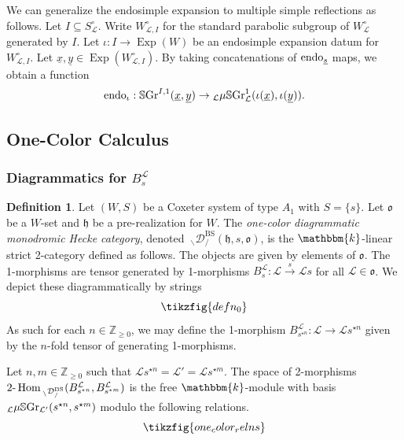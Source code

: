 \documentclass{amsart}
\newcommand{\Z}{\mathbb{Z}}
\renewcommand{\k}{\mathbbm{k}}
\newcommand{\scrL}{\mathcal{L}}
\DeclareMathOperator{\Hom}{Hom}
\newcommand{\TwoHom}{2\textnormal{-}\Hom}
\newcommand{\fr}[1]{\mathfrak{#1}}
\DeclareMathOperator{\BS}{BS}
\newcommand{\EWmon}[2]{\:_{#1 \backslash} \mathcal{D}_{/ #2} }
\DeclareMathOperator{\Exp}{Exp}
\newcommand{\SGraph}{\mathbb{S}\textnormal{Gr}}
\newcommand{\VSGraph}{\mu\mathbb{S}\textnormal{Gr}}
\newcommand{\ux}{\underline{x}}
\newcommand{\uy}{\underline{y}}
\newcommand{\us}{\underline{s}}
\theoremstyle{definition}
\newtheorem{definition}[subsubsection]{Definition}
\numberwithin{equation}{subsection}
\begin{document}
We can generalize the endosimple expansion to multiple simple reflections as follows. 
Let $I \subseteq S_{\scrL}^{\circ}$. Write $W_{\scrL, I}^{\circ}$ for the standard parabolic subgroup of $W_{\scrL}^{\circ}$ generated by $I$.
Let $\iota : I \to \Exp (W)$ be an endosimple expansion datum for $W_{\scrL, I}^{\circ}$.
Let $\ux, \uy \in \Exp (W_{\scrL, I}^{\circ})$.  
By taking concatenations of $\textnormal{endo}_{\us}$ maps, we obtain a function
\[\textnormal{endo}_{\iota} : \SGraph^{I,1} (\ux, \uy) \to {}_{\scrL} \VSGraph_{\scrL}^1 (\iota (\ux), \iota (\uy)).\]

\subsection{One-Color Calculus}

\subsubsection{Diagrammatics for \texorpdfstring{$B_s^{\scrL}$}{BsL}}

\begin{definition}\label{defn:one_color_cat}
    Let $(W,S)$ be a Coxeter system of type $A_1$ with $S = \{s\}$. Let $\fr{o}$ be a $W$-set and $\fr{h}$ be a pre-realization for $W$.
    The \emph{one-color diagrammatic monodromic Hecke category}, denoted $\EWmon{}{}^{\BS} (\fr{h}, s, \fr{o})$, is the $\k$-linear strict 2-category defined as follows.
    The objects are given by elements of $\fr{o}$. The 1-morphisms are tensor generated by 1-morphisms $B_s^{\scrL} : \scrL \stackrel{s}{\to} \scrL s$ for all $\scrL \in \fr{o}$.
    We depict these diagrammatically by strings
    \begin{equation}
        \tikzfig{defn_0}
    \end{equation}
    As such for each $n \in \Z_{\geq 0}$, we may define the 1-morphism $B_{s^{\star n}}^{\scrL} : \scrL \to \scrL s^{\star n}$ given by the $n$-fold tensor of generating 1-morphisms.

    Let $n,m \in \Z_{\geq 0}$ such that $\scrL s^{\star n} = \scrL' = \scrL s^{\star m}$.
    The space of 2-morphisms $\TwoHom_{\EWmon{}{}^{\BS}} (B_{s^{\star n}}^{\scrL}, B_{s^{\star m}}^{\scrL})$ is the free $\k$-module with basis ${}_{\scrL} \VSGraph_{\scrL'} (s^{\star n}, s^{\star m})$ modulo the following relations.  
    \begin{equation}\label{eq:one_color_cat} 
        \tikzfig{one_color_relns}
    \end{equation}
\end{definition}
\end{document}
